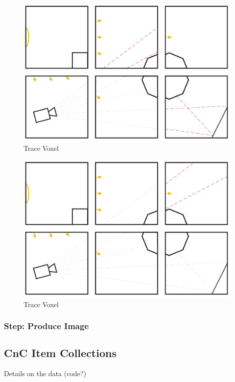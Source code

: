 \documentclass{vgtc}                          %
\begin{document}
\begin{figure}[htb]
  \centering
  \includegraphics[width=\columnwidth]{./../img/Trace3.pdf}
  \caption{Trace Voxel}
\end{figure}

\begin{figure}[htb]
  \centering
  \includegraphics[width=\columnwidth]{./../img/Trace4.pdf}
  \caption{Trace Voxel}
\end{figure}

\subsubsection{Step: Produce Image}

\subsection{CnC Item Collections}
Details on the data (code?)
\end{document}
